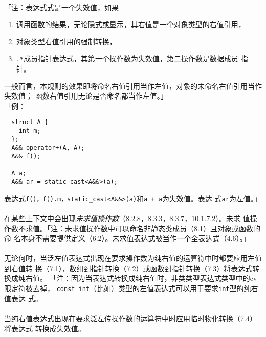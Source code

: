\paragraph{}
「注：表达式式是一个失效值，如果
\begin{enumerate}
  \item{调用函数的结果，无论隐式或显示，其右值是一个对象类型的右值引用，}
  \item{对象类型右值引用的强制转换，}
  \item{\texttt{.*}成员指针表达式，其第一个操作数为失效值，第二操作数是数据成员
    指针。}
\end{enumerate}
一般而言，本规则的效果即将命名右值引用当作左值，对象的未命名右值引用当作失效值；
函数右值引用无论是否命名都当作左值。」                                        \\
「例：
\begin{lstlisting}
  struct A {
    int m;
  };
  A&& operator+(A, A);
  A&& f();

  A a;
  A&& ar = static_cast<A&&>(a);
\end{lstlisting}
表达式\texttt{f()，f().m，static\_cast<A\&\&>(a)}和\texttt{a + a}为失效值。表达
式\texttt{ar}为左值。」

\paragraph{}
在某些上下文中会出现\textit{未求值操作数}（8.2.8，8.3.3，8.3.7，10.1.7.2）。未求
值操作数不求值。「注：未求值操作数中可以命名非静态类成员（8.1）且对象或函数的命
名本身不需要提供定义（6.2）。未求值表达式被当作一个全表达式（4.6）。」

\paragraph{}
无论何时，当泛左值表达式出现在要求操作数为纯右值的运算符中时都要应用左值到右值转
换（7.1），数组到指针转换（7.2）或函数到指针转换（7.3）将表达式转换成纯右值。
「注：因为当表达式转换成纯右值时，非类类型表达式类型中的cv限定符被去掉，
\texttt{const int}（比如）类型的左值表达式可以用于要求\texttt{int}型的纯右值表达
式。

\paragraph{}
当纯右值表达式出现在要求泛左传操作数的运算符中时应用临时物化转换（7.4）将表达式
转换成失效值。

